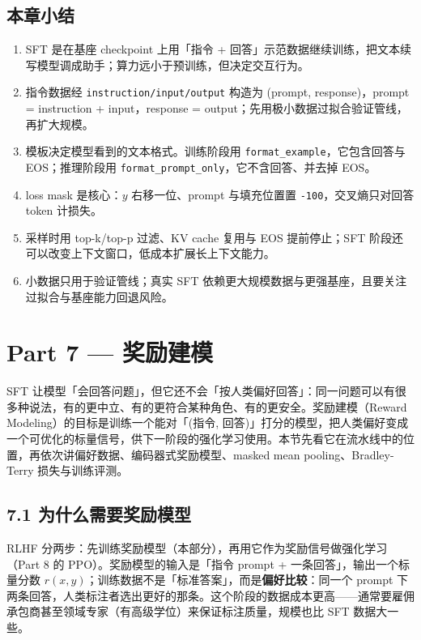 \subsection{本章小结}
\begin{enumerate}
\item SFT 是在基座 checkpoint 上用「指令 + 回答」示范数据继续训练，把文本续写模型调成助手；算力远小于预训练，但决定交互行为。
\item 指令数据经 \texttt{instruction/input/output} 构造为 (prompt, response)，prompt = instruction + input，response = output；先用极小数据过拟合验证管线，再扩大规模。
\item 模板决定模型看到的文本格式。训练阶段用 \texttt{format\_example}，它包含回答与 EOS；推理阶段用 \texttt{format\_prompt\_only}，它不含回答、并去掉 EOS。
\item loss mask 是核心：$y$ 右移一位、prompt 与填充位置置 \texttt{-100}，交叉熵只对回答 token 计损失。
\item 采样时用 top-k/top-p 过滤、KV cache 复用与 EOS 提前停止；SFT 阶段还可以改变上下文窗口，低成本扩展长上下文能力。
\item 小数据只用于验证管线；真实 SFT 依赖更大规模数据与更强基座，且要关注过拟合与基座能力回退风险。
\end{enumerate}

\section{Part 7 — 奖励建模}

SFT 让模型「会回答问题」，但它还不会「按人类偏好回答」：同一问题可以有很多种说法，有的更中立、有的更符合某种角色、有的更安全。奖励建模（Reward Modeling）的目标是训练一个能对「(指令, 回答)」打分的模型，把人类偏好变成一个可优化的标量信号，供下一阶段的强化学习使用。本节先看它在流水线中的位置，再依次讲偏好数据、编码器式奖励模型、masked mean pooling、Bradley-Terry 损失与训练评测。

\subsection{7.1 为什么需要奖励模型}

RLHF 分两步：先训练奖励模型（本部分），再用它作为奖励信号做强化学习（Part 8 的 PPO）。奖励模型的输入是「指令 prompt + 一条回答」，输出一个标量分数 $r(x, y)$；训练数据不是「标准答案」，而是\textbf{偏好比较}：同一个 prompt 下两条回答，人类标注者选出更好的那条。这个阶段的数据成本更高——通常要雇佣承包商甚至领域专家（有高级学位）来保证标注质量，规模也比 SFT 数据大一些。

